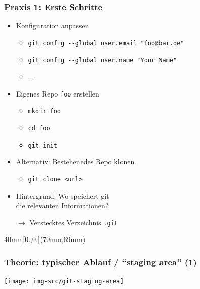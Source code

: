 \documentclass{beamer}
\begin{document}

\begin{frame}[label=gitintro20]
\frametitle{Praxis 1: Erste Schritte}
\begin{itemize}
 \item Konfiguration anpassen
 \begin{itemize}
  \item \texttt{git config -{}-global user.email "foo@bar.de"}
  \item \texttt{git config -{}-global user.name "Your Name"}
  \item ...
 \end{itemize}

 \item Eigenes Repo \texttt{foo} erstellen
 \begin{itemize}
  \item \texttt{mkdir foo}
  \item \texttt{cd foo}
  \item \texttt{git init}
 \end{itemize}
 \item Alternativ: Bestehenedes Repo klonen
 \begin{itemize}
  \item \texttt{git clone <url>}
 \end{itemize}
 \item[]
 \pause
 \item Hintergrund: Wo speichert git\\ die relevanten Informationen?
 \item[$\rightarrow$] Verstecktes Verzeichnis \texttt{.git}



\end{itemize}
\begin{textblock*}{40mm}[0.,0.](70mm,69mm)
\end{textblock*}
\end{frame}

\begin{frame}
  \frametitle{Theorie: typischer Ablauf / "`staging area"' (1)}
  \begin{center}
    \texttt{[image: img-src/git-staging-area]}
  \end{center}
\end{frame}
\end{document}
